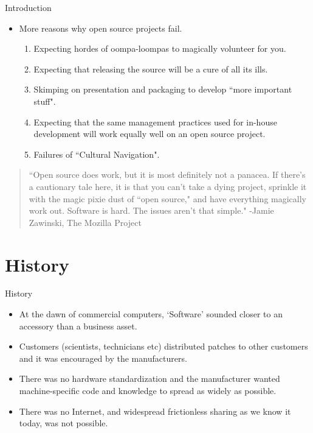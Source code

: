 \documentclass{beamer}
\begin{document}
\begin{frame}{Introduction}
	\begin{itemize}
	\item More reasons why open source projects fail.
	\begin{enumerate}
		\item Expecting hordes of oompa-loompas to magically volunteer for you.
		\item Expecting that releasing the source will be a cure of all its ills.
		\item Skimping on presentation and packaging to develop ``more important stuff".
		\item Expecting that the same management practices used for in-house development will work equally well on an open source project.
		\item Failures of ``Cultural Navigation".
	\end{enumerate}
	\end{itemize}
\begin{quote}
\tiny{``Open source does work, but it is most definitely not a panacea. If there's a cautionary tale here, it is that you can't take a dying project, sprinkle it with the magic pixie dust of ``open source," and have everything magically work out. Software is hard. The issues aren't that simple."
-Jamie Zawinski,  The Mozilla Project}
\end{quote}
\end{frame}

\section{History}

\begin{frame}{History}
\begin{itemize}
	\item At the dawn of commercial computers, `Software' sounded closer to an accessory than a business asset. \pause
	\item Customers (scientists, technicians etc) distributed patches to other customers and it was encouraged by the manufacturers. \pause
	\item There was no hardware standardization and the manufacturer wanted machine-specific code and knowledge to spread as widely as possible. \pause
	\item There was no Internet, and widespread frictionless sharing as we know it today, was not possible.
\end{itemize}
\end{frame}
\end{document}
